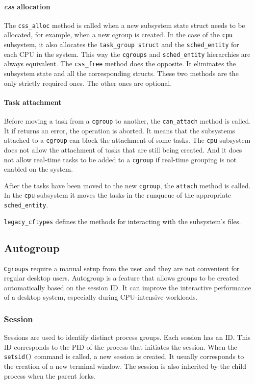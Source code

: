 \paragraph{\textit{css} allocation}
The \verb|css_alloc| method is called when a new subsystem state struct needs to be allocated, for example, when a new cgroup is created. In the case of the \verb|cpu| subsystem, it also allocates the \verb|task_group struct| and the \verb|sched_entity| for each CPU in the system. This way the \verb|cgroups| and \verb|sched_entity| hierarchies are always equivalent. The \verb|css_free| method does the opposite. It eliminates the subsystem state and all the corresponding structs. These two methods are the only strictly required ones. The other ones are optional.

\paragraph{Task attachment}
Before moving a task from a \verb|cgroup| to another, the \verb|can_attach| method is called. It if returns an error, the operation is aborted. It means that the subsystems attached to a \verb|cgroup| can block the attachment of some tasks. The \verb|cpu| subsystem does not allow the attachment of tasks that are still being created. And it does not allow real-time tasks to be added to a \verb|cgroup| if real-time grouping is not enabled on the system. 

After the tasks have been moved to the new \verb|cgroup|, the \verb|attach| method is called. In the \verb|cpu| subsystem it moves the tasks in the runqueue of the appropriate \verb|sched_entity|.

\verb|legacy_cftypes| defines the methods for interacting with the subsystem's files.

\subsection{Autogroup}%

\verb|Cgroups| require a manual setup from the user and they are not convenient for regular desktop users. Autogroup is a feature that allows groups to be created automatically based on the session ID. It can improve the interactive performance of a desktop system, especially during CPU-intensive workloads.

\subsubsection{Session}
Sessions are used to identify distinct process groups. Each session has an ID. This ID corresponds to the PID of the process that initiates the session. When the \verb|setsid()| command is called, a new session is created. It usually corresponds to the creation of a new terminal window. The session is also inherited by the child process when the parent forks.

